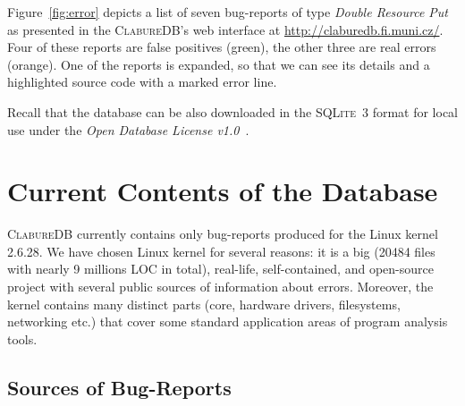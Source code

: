 \documentclass[10pt]{llncs}
\newcommand\Color[2]{\textcolor{#1}{#2}}
\newcommand{\nb}[1]{\marginpar{\scriptsize #1}}
\newcommand\todo[1]{\nb{\Color{red}{#1}}}
\newcommand\cdb{\textsc{ClabureDB}\xspace}
\begin{document}
%

Figure~\ref{fig:error} depicts a list of seven bug-reports of type 
\emph{Double Resource Put} as presented in the \cdb's web interface at 
\url{http://claburedb.fi.muni.cz/}. Four of these reports are false positives
(green), the other three are real errors (orange). One of the reports is
expanded, so that we can see its details and a highlighted source code with a
marked error line.

Recall that the database can be also downloaded in the \textsc{SQLite~3}
format for local use under the \emph{Open Database License
v1.0}~\cite{ODbL}.


\section{Current Contents of the Database}\label{sec:data}



\cdb currently contains only bug-reports produced for the Linux kernel
2.6.28. We have chosen Linux kernel for several reasons: it is a big (20484
files with nearly 9 millions LOC in total), real-life, self-contained, and
open-source project with several public sources of information about
errors. Moreover, the kernel contains many distinct parts (core, hardware
drivers, filesystems, networking etc.) that cover some standard application
areas of program analysis tools.

\subsection{Sources of Bug-Reports}
\end{document}

